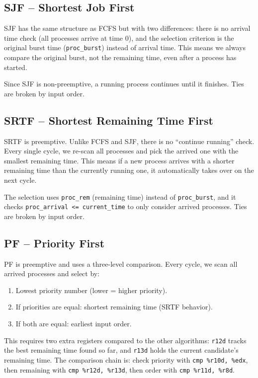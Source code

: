 \documentclass[a4paper,12pt]{article}
\begin{document}
\subsection{SJF -- Shortest Job First}

SJF has the same structure as FCFS but with two differences: there is no arrival time check (all processes arrive at time 0), and the selection criterion is the original burst time (\texttt{proc\_burst}) instead of arrival time. This means we always compare the original burst, not the remaining time, even after a process has started.

Since SJF is non-preemptive, a running process continues until it finishes. Ties are broken by input order.

\subsection{SRTF -- Shortest Remaining Time First}

SRTF is preemptive. Unlike FCFS and SJF, there is no ``continue running'' check. Every single cycle, we re-scan all processes and pick the arrived one with the smallest remaining time. This means if a new process arrives with a shorter remaining time than the currently running one, it automatically takes over on the next cycle.

The selection uses \texttt{proc\_rem} (remaining time) instead of \texttt{proc\_burst}, and it checks \texttt{proc\_arrival <= current\_time} to only consider arrived processes. Ties are broken by input order.

\subsection{PF -- Priority First}

PF is preemptive and uses a three-level comparison. Every cycle, we scan all arrived processes and select by:

\begin{enumerate}
    \item Lowest priority number (lower = higher priority).
    \item If priorities are equal: shortest remaining time (SRTF behavior).
    \item If both are equal: earliest input order.
\end{enumerate}

This requires two extra registers compared to the other algorithms: \texttt{r12d} tracks the best remaining time found so far, and \texttt{r13d} holds the current candidate's remaining time. The comparison chain is: check priority with \texttt{cmp \%r10d, \%edx}, then remaining with \texttt{cmp \%r12d, \%r13d}, then order with \texttt{cmp \%r11d, \%r8d}.
\end{document}
